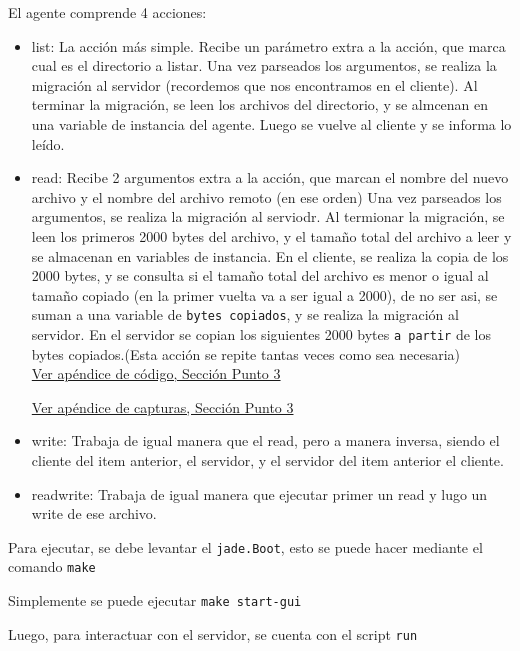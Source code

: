 \documentclass[12pt,journal,compsoc]{IEEEtran}
\begin{document}
El agente comprende 4 acciones:
\begin{itemize}
  \item list: La acción más simple. Recibe un parámetro extra a la acción,
        que marca cual es el directorio a listar.
        Una vez parseados los argumentos, se realiza la migración al servidor
        (recordemos que nos encontramos en el cliente).
        Al terminar la migración, se leen los archivos del directorio, y se
        almcenan en una variable de instancia del agente. Luego se vuelve al
        cliente y se informa lo leído.
  \item read: Recibe 2 argumentos extra a la acción, que marcan el nombre del
        nuevo archivo y el nombre del archivo remoto (en ese orden)
        Una vez parseados los argumentos, se realiza la migración al serviodr.
        Al termionar la migración, se leen los primeros 2000 bytes del archivo,
        y el tamaño total del archivo a leer y se almacenan en variables de instancia.
        En el cliente, se realiza la copia de los 2000 bytes, y se consulta si el
        tamaño total del archivo es menor o igual al tamaño copiado (en la primer
        vuelta va a ser igual a 2000), de no ser asi, se suman a una variable de
        \texttt{bytes copiados}, y se realiza la migración al servidor.
        En el servidor se copian los siguientes 2000 bytes \texttt{a partir}
        de los bytes copiados.(Esta acción se repite tantas veces como 
        sea necesaria)\\
        \hyperref[section:code-punto3]{Ver apéndice de código, Sección Punto 3}

        \hyperref[fig:initial-file]{Ver apéndice de capturas, Sección Punto 3}
  
  \item write: Trabaja de igual manera que el read, pero a manera inversa,
        siendo el cliente del item anterior, el servidor, y el servidor del item
        anterior el cliente.
  \item readwrite: Trabaja de igual manera que ejecutar primer un read y lugo un
        write de ese archivo.
\end{itemize}

Para ejecutar, se debe levantar el \texttt{jade.Boot}, esto se puede hacer
mediante el comando \texttt{make}

Simplemente se puede ejecutar \texttt{make start-gui}

Luego, para interactuar con el servidor, se cuenta con el script \texttt{run}
\end{document}
